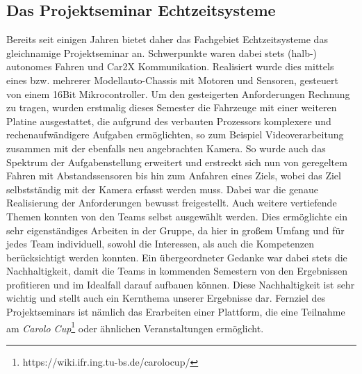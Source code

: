 \subsection{Das Projektseminar Echtzeitsysteme}
Bereits seit einigen Jahren bietet daher das Fachgebiet Echtzeitsysteme das gleichnamige Projektseminar an. Schwerpunkte waren dabei stets (halb-) autonomes Fahren und Car2X Kommunikation. Realisiert wurde dies mittels eines bzw. mehrerer Modellauto-Chassis mit Motoren und Sensoren, gesteuert von einem 16Bit Mikrocontroller. Um den gesteigerten Anforderungen Rechnung zu tragen, wurden erstmalig dieses Semester die Fahrzeuge mit einer weiteren Platine ausgestattet, die aufgrund des verbauten Prozessors komplexere und rechenaufwändigere Aufgaben ermöglichten, so zum Beispiel Videoverarbeitung zusammen mit der ebenfalls neu angebrachten Kamera. So wurde auch das Spektrum der Aufgabenstellung erweitert und erstreckt sich nun von geregeltem Fahren mit Abstandssensoren bis hin zum Anfahren eines Ziels, wobei das Ziel selbstständig mit der Kamera erfasst werden muss. Dabei war die genaue Realisierung der Anforderungen bewusst freigestellt. Auch weitere vertiefende Themen konnten von den Teams selbst ausgewählt werden. Dies ermöglichte ein sehr eigenständiges Arbeiten in der Gruppe, da hier in großem Umfang und für jedes Team individuell, sowohl die Interessen, als auch die Kompetenzen berücksichtigt werden konnten. Ein übergeordneter Gedanke war dabei stets die Nachhaltigkeit, damit die Teams in kommenden Semestern von den Ergebnissen profitieren und im Idealfall darauf aufbauen können. Diese Nachhaltigkeit ist sehr wichtig und stellt auch ein Kernthema unserer Ergebnisse dar. Fernziel des Projektseminars ist nämlich das Erarbeiten einer Plattform, die eine Teilnahme am \textit{Carolo Cup}\footnote[1]{https://wiki.ifr.ing.tu-bs.de/carolocup/} oder ähnlichen Veranstaltungen ermöglicht.
